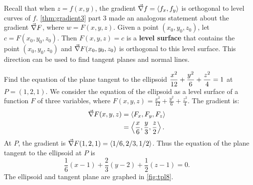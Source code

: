 Recall that when $z=f(x,y)$, the gradient $\vec\nabla f =\left\langle f_x,f_y\right\rangle$ is orthogonal to level curves of $f$. \autoref{thm:gradient3} part 3 made an analogous statement about the gradient $\vec\nabla F$, where $w= F(x,y,z)$. Given a point $(x_0,y_0,z_0)$, let $c = F(x_0,y_0,z_0)$. Then $F(x,y,z) = c$ is a \textbf{level surface} that contains the point $(x_0,y_0,z_0)$ and %
$\vec\nabla F(x_0,y_0,z_0)$ is orthogonal to this level surface.
%
%
%
This direction can be used to find tangent planes and normal lines.

\begin{example}\label{ex_tpl8}%
Find the equation of the plane tangent to the ellipsoid $\displaystyle \frac{x^2}{12} +\frac{y^2}{6}+\frac{z^2}{4}=1$ at $P = (1,2,1)$.
\solution
We consider the equation of the ellipsoid as a level surface of a function $F$ of three variables, where $F(x,y,z) = \frac{x^2}{12} +\frac{y^2}{6}+\frac{z^2}{4}$.  The gradient is:
%
%
\begin{align*}
\vec\nabla F(x,y,z) &=\left\langle F_x, F_y,F_z\right\rangle\\
			&=\left\langle \frac x6, \frac y3, \frac z2\right\rangle.
\end{align*}
At  $P$, the gradient is $\vec\nabla F(1,2,1) =\left\langle 1/6, 2/3, 1/2\right\rangle$. Thus the equation of the plane tangent to the ellipsoid at $P$ is
\[\frac 16(x-1) + \frac23(y-2) + \frac 12(z-1) = 0.\]
The ellipsoid and tangent plane are graphed in \autoref{fig:tpl8}.
\end{example}


